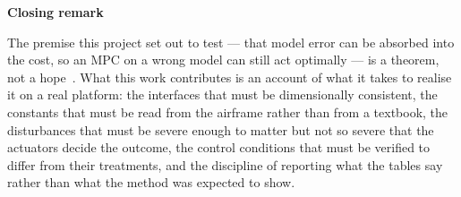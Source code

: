 \documentclass[11pt,a4paper,twoside,openright]{report}
\theoremstyle{plain}
\theoremstyle{definition}
\theoremstyle{remark}
\newcommand{\keyhead}[1]{\textbf{\sffamily\small\textcolor{NavyDeep}{#1}}\par\vspace{2pt}}
\begin{document}
	\begin{keybox}
		\keyhead{Closing remark}
		The premise this project set out to test --- that model error can be absorbed
		into the cost, so an MPC on a wrong model can still act optimally --- is a
		theorem, not a hope~\cite{gros2020data}. What this work contributes is an
		account of what it takes to realise it on a real platform: the interfaces that
		must be dimensionally consistent, the constants that must be read from the
		airframe rather than from a textbook, the disturbances that must be severe
		enough to matter but not so severe that the actuators decide the outcome, the
		control conditions that must be verified to differ from their treatments, and
		the discipline of reporting what the tables say rather than what the method was
		expected to show.
	\end{keybox}
\end{document}
